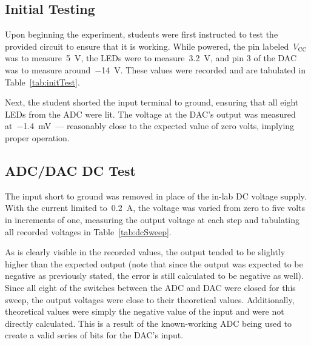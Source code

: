 \subsection{Initial Testing}
Upon beginning the experiment, students were first instructed to test the provided circuit to ensure that it is working.  While powered, the pin labeled~$V_\text{CC}$ was to measure~\SI{5}{\volt}, the LEDs were to measure~\SI{3.2}{\volt}, and pin 3 of the DAC was to measure around~\SI{-14}{\volt}.  These values were recorded and are tabulated in Table~\ref{tab:initTest}.
%
\begin{table}[H]
	\centering
	
	\parbox{.6\textwidth}{
	\caption[Measured Initial Values]{List of values recorded during the initial testing phases.  The voltages were within reasonable limits, allowing the student to safely assume that the board was operating correctly.}
	\label{tab:initTest}}
\end{table}
%
Next, the student shorted the input terminal to ground, ensuring that all eight LEDs from the ADC were lit.  The voltage at the DAC's output was measured at~\SI{-1.4}{\milli\volt}~--- reasonably close to the expected value of zero volts, implying proper operation.

\subsection{ADC/DAC DC Test}
The input short to ground was removed in place of the in-lab DC voltage supply.  With the current limited to~\SI{0.2}{\ampere}, the voltage was varied from zero to five volts in increments of one, measuring the output voltage at each step and tabulating all recorded voltages in Table~\ref{tab:dcSweep}.
%
\begin{table}[H]
	\centering
	
	\parbox{.6\textwidth}{
	\caption[DC Sweep Results]{Data recorded from a DC sweep performed with all eight DIP switches closed.}
	\label{tab:dcSweep}}
\end{table}
%
As is clearly visible in the recorded values, the output tended to be slightly higher than the expected output (note that since the output was expected to be negative as previously stated, the error is still calculated to be negative as well).  Since all eight of the switches between the ADC and DAC were closed for this sweep, the output voltages were close to their theoretical values.  Additionally, theoretical values were simply the negative value of the input and were not directly calculated.  This is a result of the known-working ADC being used to create a valid series of bits for the DAC's input.

